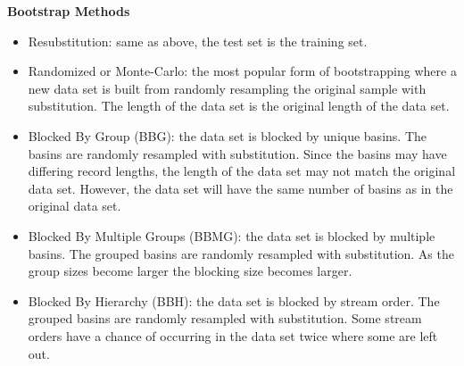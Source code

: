 \textbf{Bootstrap Methods}
\begin{itemize}
	\item Resubstitution: same as above, the test set is the training set.
	\item Randomized or Monte-Carlo: the most popular form of bootstrapping where a new data set is built from randomly resampling the original sample with substitution. The length of the data set is the original length of the data set.
	\item Blocked By Group (BBG): the data set is blocked by unique basins. The basins are randomly resampled with substitution. Since the basins may have differing record lengths, the length of the data set may not match the original data set. However, the data set will have the same number of basins as in the original data set. 
	\item Blocked By Multiple Groups (BBMG): the data set is blocked by multiple basins. The grouped basins are randomly resampled with substitution. As the group sizes become larger the blocking size becomes larger. 
	\item Blocked By Hierarchy (BBH): the data set is blocked by stream order. The grouped basins are randomly resampled with substitution. Some stream orders have a chance of occurring in the data set twice where some are left out. 
\end{itemize}

